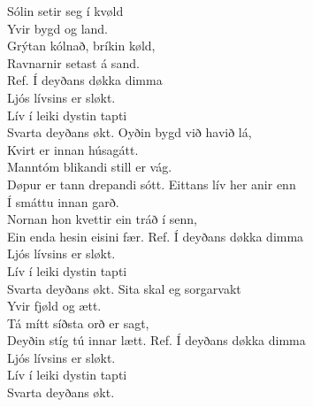
Sólin setir seg í kvøld\\
Yvir bygd og land.\\
Grýtan kólnað, bríkin køld,\\
Ravnarnir setast á sand.\\
\hops
Ref. Í deyðans døkka dimma\\
 Ljós lívsins er sløkt.\\
 Lív í leiki dystin tapti\\
 Svarta deyðans økt.
\hops
Oyðin bygd við havið lá,\\
Kvirt er innan húsagátt.\\
Manntóm blikandi still er vág.\\
Døpur er tann drepandi sótt.
\hops
Eittans lív her anir enn\\
Í smáttu innan garð.\\
Nornan hon kvettir ein tráð í senn,\\
Ein enda hesin eisini fær.
\hops
Ref. Í deyðans døkka dimma\\
 Ljós lívsins er sløkt.\\
 Lív í leiki dystin tapti\\
 Svarta deyðans økt.
\hops
Sita skal eg sorgarvakt\\
Yvir fjøld og ætt.\\
Tá mítt síðsta orð er sagt,\\
Deyðin stíg tú innar lætt.
\hops
Ref. Í deyðans døkka dimma\\
 Ljós lívsins er sløkt.\\
 Lív í leiki dystin tapti\\
 Svarta deyðans økt.

\clearpage
{}


